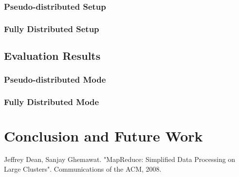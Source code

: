 \documentclass[print,ms]{nuthesis}%
\begin{document}
\subsection{Pseudo-distributed Setup }


\subsection{Fully Distributed Setup}


\section{Evaluation Results}


\subsection{Pseudo-distributed Mode}



\subsection{Fully Distributed Mode}


\chapter{Conclusion and Future Work}



\backmatter

\begin{thebibliography}{9}

 
Jeffrey Dean, Sanjay Ghemawat.
"MapReduce: Simplified Data Processing on Large Clusters".   
Communications of the ACM, 2008.
 
\end{thebibliography}
\end{document}
